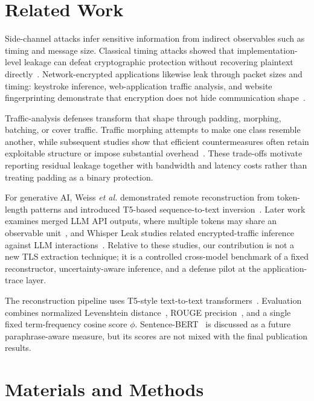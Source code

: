 \documentclass[journal,article,submit,pdftex,moreauthors]{Definitions/mdpi}
\begin{document}
\section{Related Work}
Side-channel attacks infer sensitive information from indirect observables such as timing and message size. Classical timing attacks showed that implementation-level leakage can defeat cryptographic protection without recovering plaintext directly~\cite{kocher1996timing}. Network-encrypted applications likewise leak through packet sizes and timing: keystroke inference, web-application traffic analysis, and website fingerprinting demonstrate that encryption does not hide communication shape~\cite{song2001timing,chen2010sidechannel,cai2012touching,sirinam2018deep}.

Traffic-analysis defenses transform that shape through padding, morphing, batching, or cover traffic. Traffic morphing attempts to make one class resemble another, while subsequent studies show that efficient countermeasures often retain exploitable structure or impose substantial overhead~\cite{wright2009morphing,dyer2012peekaboo}. These trade-offs motivate reporting residual leakage together with bandwidth and latency costs rather than treating padding as a binary protection.

For generative AI, Weiss \emph{et al.} demonstrated remote reconstruction from token-length patterns and introduced T5-based sequence-to-text inversion~\cite{weiss2024prompt}. Later work examines merged LLM API outputs, where multiple tokens may share an observable unit~\cite{li2026length}, and Whisper Leak studies related encrypted-traffic inference against LLM interactions~\cite{whisperleak2025}. Relative to these studies, our contribution is not a new TLS extraction technique; it is a controlled cross-model benchmark of a fixed reconstructor, uncertainty-aware inference, and a defense pilot at the application-trace layer.

The reconstruction pipeline uses T5-style text-to-text transformers~\cite{raffel2020exploring}. Evaluation combines normalized Levenshtein distance~\cite{levenshtein1966binary}, ROUGE precision~\cite{lin2004rouge}, and a single fixed term-frequency cosine score $\phi$. Sentence-BERT~\cite{reimers2019sentence} is discussed as a future paraphrase-aware measure, but its scores are not mixed with the final publication results.

\section{Materials and Methods}
\end{document}
